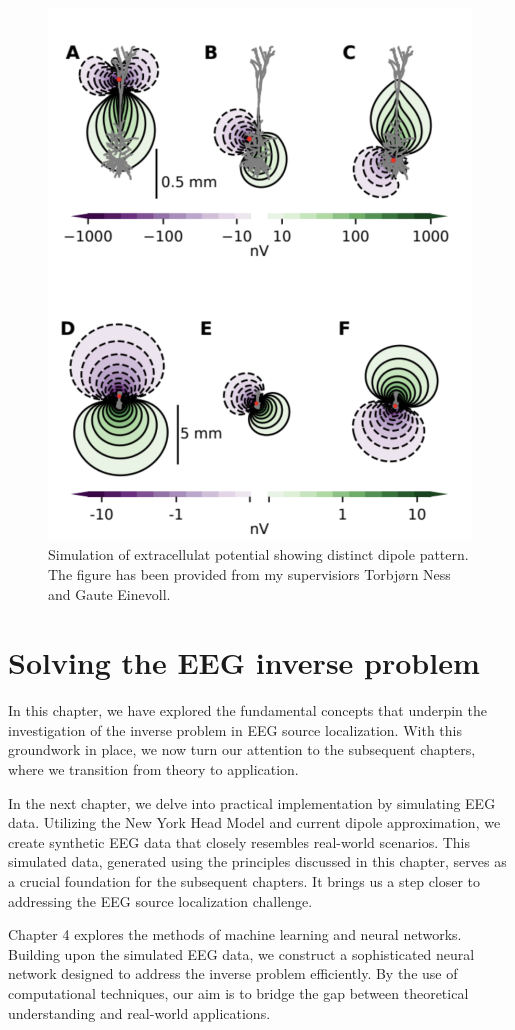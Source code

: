 \documentclass[a4paper, UKenglish, 11pt]{uiomaster}
\begin{document}
\begin{figure}
    \centering
    \includegraphics[width=\linewidth]{figures/dipole_pattern.png}
    \caption{Simulation of extracellulat potential showing distinct dipole pattern. The figure has been provided from my supervisiors Torbjørn Ness and Gaute Einevoll.}
    \label{fig:dipole_pattern}
\end{figure}

\section{Solving the EEG inverse problem}
In this chapter, we have explored the fundamental concepts that underpin the investigation of the inverse problem in EEG source localization. With this groundwork in place, we now turn our attention to the subsequent chapters, where we transition from theory to application.

In the next chapter, we delve into practical implementation by simulating EEG data. Utilizing the New York Head Model and current dipole approximation, we create synthetic EEG data that closely resembles real-world scenarios. This simulated data, generated using the principles discussed in this chapter, serves as a crucial foundation for the subsequent chapters. It brings us a step closer to addressing the EEG source localization challenge.

Chapter 4 explores the methods of machine learning and neural networks. Building upon the simulated EEG data, we construct a sophisticated neural network designed to address the inverse problem efficiently. By the use of computational techniques, our aim is to bridge the gap between theoretical understanding and real-world applications.
\end{document}
